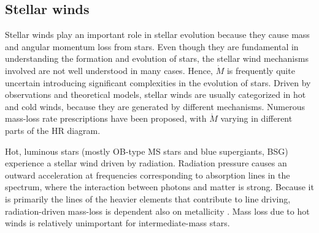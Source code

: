 \subsection{Stellar winds}\label{sub:winds}

Stellar winds play an important role in stellar evolution because they cause mass and angular momentum loss from stars. Even though they are fundamental in understanding the formation and evolution of stars, the stellar wind mechanisms involved are not well understood in many cases. Hence, $\dot{M}$ is frequently quite uncertain introducing significant complexities in the evolution of stars. Driven by observations and theoretical models, stellar winds are usually categorized in hot and cold winds, because they are generated by different mechanisms. Numerous mass-loss rate prescriptions have been proposed, with $\dot{M}$ varying in different parts of the HR diagram.

Hot, luminous stars (mostly OB-type MS stars and blue supergiants, BSG) experience a stellar wind driven by radiation. Radiation pressure causes an outward acceleration at frequencies corresponding to absorption lines in the spectrum, where the interaction between photons and matter is strong. Because it is primarily the lines of the heavier elements that contribute to line driving, radiation-driven mass-loss is dependent also on metallicity \citep{vink2001mass}. Mass loss due to hot winds is relatively unimportant for intermediate-mass stars.

